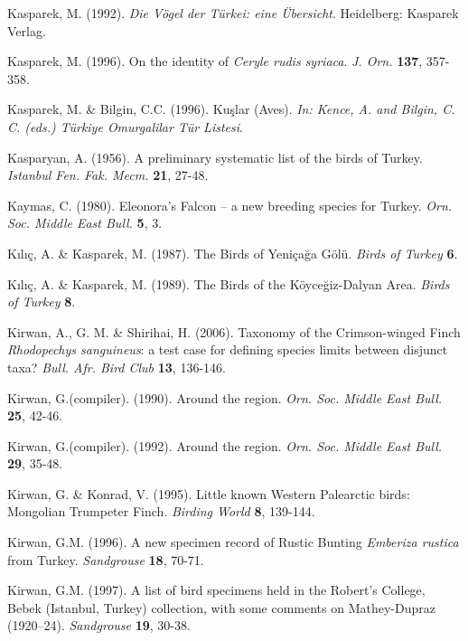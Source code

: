 \documentclass[
  10.5pt,
  a4paper,
  DIV=11,
  numbers=noendperiod,
  twocolumn]{scrreprt}
\newlength{\cslhangindent}
\newenvironment{CSLReferences}[2] %
 {\begin{list}{}{%
  \setlength{\itemindent}{0pt}
  \setlength{\leftmargin}{0pt}
  \setlength{\parsep}{0pt}
  \ifodd #1
   \setlength{\leftmargin}{\cslhangindent}
   \setlength{\itemindent}{-1\cslhangindent}
  \fi
  \setlength{\itemsep}{#2\baselineskip}}}
 {\end{list}}
\begin{document}
\begin{CSLReferences}{1}{1}
Kasparek, M. (1992). \emph{{Die Vögel der Türkei: eine Übersicht}}.
Heidelberg: Kasparek Verlag.

Kasparek, M. (1996). {On the identity of \emph{Ceryle rudis syriaca}}.
\emph{J. Orn.} \textbf{137}, 357-358.

Kasparek, M. \& Bilgin, C.C. (1996). {Kuşlar (Aves)}. \emph{In: Kence,
A. and Bilgin, C. C. (eds.) Türkiye Omurgalilar Tür Listesi}.

Kasparyan, A. (1956). {A preliminary systematic list of the birds of
Turkey}. \emph{Istanbul Fen. Fak. Mecm.} \textbf{21}, 27-48.

Kaymas, C. (1980). {Eleonora's Falcon -- a new breeding species for
Turkey}. \emph{Orn. Soc. Middle East Bull.} \textbf{5}, 3.

Kılıç, A. \& Kasparek, M. (1987). {The Birds of Yeniçağa Gölü}.
\emph{Birds of Turkey} \textbf{6}.

Kılıç, A. \& Kasparek, M. (1989). {The Birds of the Köyceğiz-Dalyan
Area}. \emph{Birds of Turkey} \textbf{8}.

Kirwan, A., G. M. \& Shirihai, H. (2006). {Taxonomy of the
Crimson-winged Finch \emph{Rhodopechys sanguineus}: a test case for
defining species limits between disjunct taxa?} \emph{Bull. Afr. Bird
Club} \textbf{13}, 136-146.

Kirwan, G.(compiler). (1990). {Around the region}. \emph{Orn. Soc.
Middle East Bull.} \textbf{25}, 42-46.

Kirwan, G.(compiler). (1992). {Around the region}. \emph{Orn. Soc.
Middle East Bull.} \textbf{29}, 35-48.

Kirwan, G. \& Konrad, V. (1995). {Little known Western Palearctic birds:
Mongolian Trumpeter Finch}. \emph{Birding World} \textbf{8}, 139-144.

Kirwan, G.M. (1996). {A new specimen record of Rustic Bunting
\emph{Emberiza rustica} from Turkey}. \emph{Sandgrouse} \textbf{18},
70-71.

Kirwan, G.M. (1997). {A list of bird specimens held in the Robert's
College, Bebek (Istanbul, Turkey) collection, with some comments on
Mathey-Dupraz (1920--24)}. \emph{Sandgrouse} \textbf{19}, 30-38.


\end{CSLReferences}
\end{document}
